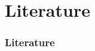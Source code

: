 \documentclass[a4paper,10pt,handout]{beamer}
\begin{document}
\begin{frame}[allowframebreaks]
{\begin{itemize}
%		
%		
%		
%		
		
	\end{itemize}
}

\end{frame}


\section{Literature}

\begin{frame}[allowframebreaks]
\frametitle{Literature}

%	

%	 
	 

{\footnotesize
	
}	
\end{frame}

\backupend
\end{document}
